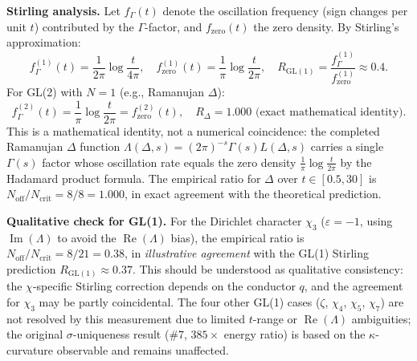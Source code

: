 \documentclass[11pt, a4paper]{article}
\theoremstyle{definition}
\theoremstyle{plain}
\begin{document}
\medskip\noindent
\textbf{Stirling analysis.}
Let $f_\Gamma(t)$ denote the oscillation frequency (sign changes per unit $t$)
contributed by the $\Gamma$-factor, and $f_\mathrm{zero}(t)$ the zero density.
By Stirling's approximation:
\begin{equation}
  f_\Gamma^{(1)}(t) = \frac{1}{2\pi}\log\frac{t}{4\pi}, \quad
  f_\mathrm{zero}^{(1)}(t) = \frac{1}{\pi}\log\frac{t}{2\pi}, \quad
  R_{\mathrm{GL}(1)} = \frac{f_\Gamma^{(1)}}{f_\mathrm{zero}^{(1)}} \approx 0.4.
  \label{eq:stirling_ratio_gl1}
\end{equation}
For GL(2) with $N = 1$ (e.g., Ramanujan $\Delta$):
\begin{equation}
  f_\Gamma^{(2)}(t) = \frac{1}{\pi}\log\frac{t}{2\pi} = f_\mathrm{zero}^{(2)}(t), \quad
  R_{\Delta} = 1.000 \text{ (exact mathematical identity).}
  \label{eq:stirling_ratio_gl2}
\end{equation}
This is a mathematical identity, not a numerical coincidence: the
completed Ramanujan $\Delta$ function $\Lambda(\Delta, s) = (2\pi)^{-s}\Gamma(s)L(\Delta,s)$
carries a single $\Gamma(s)$ factor whose oscillation rate equals the zero
density $\tfrac{1}{\pi}\log\tfrac{t}{2\pi}$ by the Hadamard product formula.
The empirical ratio for $\Delta$ over $t \in [0.5, 30]$ is $N_\mathrm{off}/N_\mathrm{crit} = 8/8 = 1.000$,
in exact agreement with the theoretical prediction.

\medskip\noindent
\textbf{Qualitative check for GL(1).}
For the Dirichlet character $\chi_3$ ($\varepsilon = -1$, using
$\operatorname{Im}(\Lambda)$ to avoid the $\operatorname{Re}(\Lambda)$
bias), the empirical ratio is $N_\mathrm{off}/N_\mathrm{crit} = 8/21 = 0.38$,
in \emph{illustrative agreement} with the GL(1) Stirling prediction
$R_{\mathrm{GL}(1)} \approx 0.37$.  This should be understood as
qualitative consistency: the $\chi$-specific Stirling correction
depends on the conductor $q$, and the agreement for $\chi_3$ may be
partly coincidental.  The four other GL(1) cases ($\zeta$, $\chi_4$, $\chi_5$,
$\chi_7$) are not resolved by this measurement due to limited $t$-range
or $\operatorname{Re}(\Lambda)$ ambiguities; the original $\sigma$-uniqueness
result (\#7, $385\times$ energy ratio) is based on the $\kappa$-curvature
observable and remains unaffected.
\end{document}
